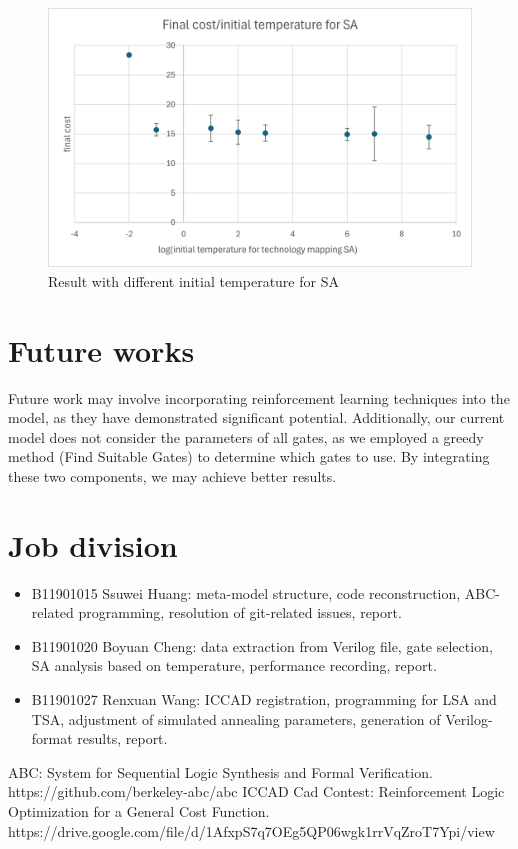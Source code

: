 \documentclass[conference]{IEEEtran}
\begin{document}
\begin{figure}
    \centering
    \includegraphics[width=0.9\linewidth]{cost.png}
    \caption{Result with different initial temperature for SA}
    \label{fig:enter-label}
\end{figure}

\section{Future works}
Future work may involve incorporating reinforcement learning techniques into the model, as they have demonstrated significant potential. Additionally, our current model does not consider the parameters of all gates, as we employed a greedy method (Find Suitable Gates) to determine which gates to use. By integrating these two components, we may achieve better results.

\section{Job division}
\begin{itemize}
    \item B11901015 Ssuwei Huang: meta-model structure, code reconstruction, ABC-related programming, resolution of git-related issues, report.
    \item B11901020 Boyuan Cheng: data extraction from Verilog file, gate selection, SA analysis based on temperature, performance recording, report.
    \item B11901027 Renxuan Wang: ICCAD registration, programming for LSA and TSA, adjustment of simulated annealing parameters, generation of Verilog-format results, report.
\end{itemize}

\begin{thebibliography}{00}
 ABC: System for Sequential Logic Synthesis and Formal Verification. https://github.com/berkeley-abc/abc
 ICCAD Cad Contest: Reinforcement Logic Optimization for a General Cost Function. https://drive.google.com/file/d/1AfxpS7q7OEg5QP06wgk1rrVqZroT7Ypi/view
\end{thebibliography}
\end{document}
